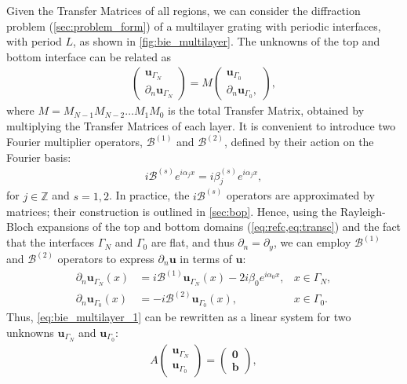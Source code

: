 \documentclass[reprint,amsmath,amssymb,
 aps]{revtex4-2}
\newcommand{\bol}{\boldsymbol}
\newcommand{\Z}{\mathbb{Z}}
\newcommand{\Bcal}{\mathcal{B}}
\begin{document}
Given the Transfer Matrices of all regions, we can consider the diffraction problem (\cref{sec:problem_form}) of a multilayer grating with periodic interfaces, with period $L$, as shown in \cref{fig:bie_multilayer}. The unknowns of the top and bottom interface can be related as
\begin{align}
\begin{pmatrix}
\bol u_{\Gamma_{N}} \\
\partial_n \bol u_{\Gamma_{N}} 
\end{pmatrix} 
= M
\begin{pmatrix}
\bol u_{\Gamma_{0}} \\
\partial_n \bol u_{\Gamma_{0}},
\end{pmatrix}, \label{eq:bie_multilayer_1}
\end{align}
where $M = M_{N-1}M_{N-2}\dots M_1M_0 $ is the total Transfer Matrix, obtained by multiplying the Transfer Matrices of each layer. It is convenient to introduce two Fourier multiplier operators, $\Bcal^{(1)}$ and $\Bcal^{(2)}$, defined by their action on the Fourier basis:
\begin{align}
i\Bcal^{(s)}e^{i\alpha_j x} = i\beta_j^{(s)}e^{i\alpha_j x}, \label{eq:bop}
\end{align}
for $j\in\Z$ and $s=1,2$. In practice, the $i\Bcal^{(s)}$ operators are approximated by matrices; their construction is outlined in \cref{sec:bop}. Hence, using the Rayleigh-Bloch expansions of the top and bottom domains (\cref{eq:refc,eq:transc}) and the fact that the interfaces $\Gamma_N$ and $\Gamma_0$ are flat, and thus $\partial_n = \partial_y$, we can employ $\Bcal^{(1)}$ and $\Bcal^{(2)}$ operators to express $\partial_n \bol u$ in terms of $\bol u$:
\begin{align}
\partial_n \bol u_{\Gamma_{N}}(x) &= i\Bcal^{(1)}\bol u_{\Gamma_{N}}(x) - 2i\beta_0 e^{i\alpha_0 x}, &x \in \Gamma_N,\\
\partial_n \bol u_{\Gamma_{0}}(x) &= -i\Bcal^{(2)}\bol u_{\Gamma_{0}}(x), &x \in \Gamma_0.
\end{align}
Thus, \cref{eq:bie_multilayer_1} can be rewritten as a linear system for two unknowns $\bol u_{\Gamma_{N}}$ and $\bol u_{\Gamma_{0}}$:
\begin{align}
A
\begin{pmatrix}
\bol u_{\Gamma_{N}} \\
\bol u_{\Gamma_{0}} 
\end{pmatrix} 
= \begin{pmatrix}
\bol 0 \\
\bol b
\end{pmatrix} ,
\label{eq:bie_multilayer_2}
\end{align}
\end{document}
